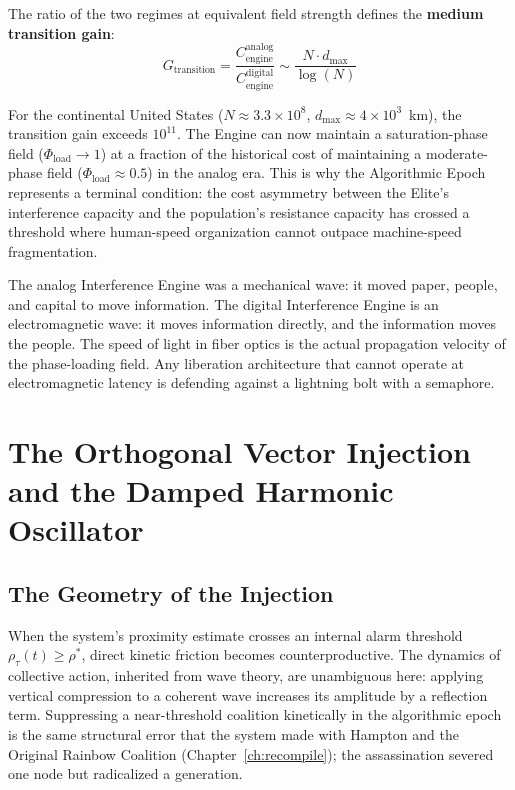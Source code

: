The ratio of the two regimes at equivalent field strength defines the \textbf{medium transition gain}:
\begin{equation}\label{eq:14.2c-medium-gain}
G_{\text{transition}} = \frac{C_{\text{engine}}^{\text{analog}}}{C_{\text{engine}}^{\text{digital}}} \sim \frac{N \cdot d_{\text{max}}}{\log(N)}
\end{equation}

For the continental United States ($N \approx 3.3 \times 10^8$, $d_{\text{max}} \approx 4 \times 10^3$~km), the transition gain exceeds $10^{11}$. The Engine can now maintain a saturation-phase field ($\Phi_{\text{load}} \to 1$) at a fraction of the historical cost of maintaining a moderate-phase field ($\Phi_{\text{load}} \approx 0.5$) in the analog era. This is why the Algorithmic Epoch represents a terminal condition: the cost asymmetry between the Elite's interference capacity and the population's resistance capacity has crossed a threshold where human-speed organization cannot outpace machine-speed fragmentation.

\begin{keyinsight}
The analog Interference Engine was a mechanical wave: it moved paper, people, and capital to move information. The digital Interference Engine is an electromagnetic wave: it moves information directly, and the information moves the people. The speed of light in fiber optics is the actual propagation velocity of the phase-loading field. Any liberation architecture that cannot operate at electromagnetic latency is defending against a lightning bolt with a semaphore.
\end{keyinsight}
\section{The Orthogonal Vector Injection and the Damped Harmonic Oscillator}
\label{sec:orthogonal_vector}
\label{sec:orthogonal_injection}

\subsection{The Geometry of the Injection}

When the system's proximity estimate crosses an internal alarm threshold $\rho_{\tau}(t) \geq \rho^{*}$, direct kinetic friction becomes counterproductive. The dynamics of collective action, inherited from wave theory, are unambiguous here: applying vertical compression to a coherent wave increases its amplitude by a reflection term. Suppressing a near-threshold coalition kinetically in the algorithmic epoch is the same structural error that the system made with Hampton and the Original Rainbow Coalition (Chapter~\ref{ch:recompile}); the assassination severed one node but radicalized a generation.

